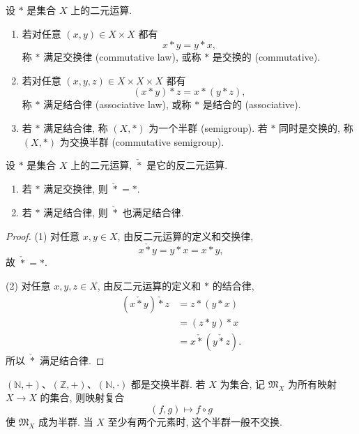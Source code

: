 \documentclass[usesamecnt, thmcnt=section, lang=cn, newtx, 10pt, scheme=chinese]{elegantbook}
\begin{document}
\begin{definition}\label{def:alg-semigroup}
设 $*$ 是集合 $X$ 上的二元运算.
\begin{enumerate}[label=\rm(\arabic*)]
  \item 若对任意 $(x,y)\in X\times X$ 都有
  \[
   x*y=y*x,
  \]
  称 $*$ 满足{\color{blue}交换律 (commutative law)}, 或称 $*$ 是{\color{blue}交换的 (commutative)}.
  \item 若对任意 $(x,y,z)\in X\times X\times X$ 都有
  \[
   (x*y)*z=x*(y*z),
  \]
  称 $*$ 满足{\color{blue}结合律 (associative law)}, 或称 $*$ 是{\color{blue}结合的 (associative)}.
  \item 若 $*$ 满足结合律, 称 $(X,*)$ 为一个{\color{blue}半群 (semigroup)}. 若 $*$ 同时是交换的, 称 $(X,*)$ 为{\color{blue}交换半群 (commutative semigroup)}.
\end{enumerate}
\end{definition}

\begin{proposition}\label{prop:alg-opposite-operation-laws}
设 $*$ 是集合 $X$ 上的二元运算, $\check{*}$ 是它的反二元运算.
\begin{enumerate}[label=\rm(\arabic*)]
  \item 若 $*$ 满足交换律, 则 $\check{*}=*$.
  \item 若 $*$ 满足结合律, 则 $\check{*}$ 也满足结合律.
\end{enumerate}
\end{proposition}

\begin{proof}
(1) 对任意 $x,y\in X$, 由反二元运算的定义和交换律,
\[
 x\mathbin{\check{*}}y=y*x=x*y,
\]
故 $\check{*}=*$.

(2) 对任意 $x,y,z\in X$, 由反二元运算的定义和 $*$ 的结合律,
\[
 \begin{aligned}
 (x\mathbin{\check{*}}y)\mathbin{\check{*}}z
 &=z*(y*x)\\
 &=(z*y)*x\\
 &=x\mathbin{\check{*}}(y\mathbin{\check{*}}z).
 \end{aligned}
\]
所以 $\check{*}$ 满足结合律.
\end{proof}

\begin{instance}
$(\mathbb N,+)$、$(\mathbb Z,+)$、$(\mathbb N,\cdot)$ 都是交换半群. 若 $X$ 为集合, 记 $\mathfrak M_X$ 为所有映射 $X\to X$ 的集合, 则映射复合
\[
 (f,g)\longmapsto f\circ g
\]
使 $\mathfrak M_X$ 成为半群. 当 $X$ 至少有两个元素时, 这个半群一般不交换.
\end{instance}
\end{document}
